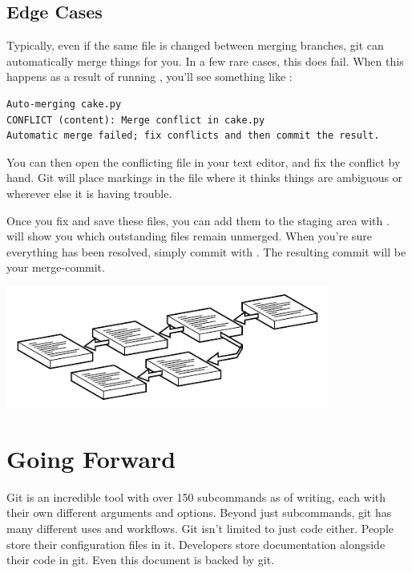 \documentclass[11pt,letterpaper,twoside]{report}
\begin{document}
\section{Edge Cases}

Typically, even if the same file is changed between merging branches, git can
automatically merge things for you. In a few rare cases, this does fail. When
this happens as a result of running , you'll see something
like \cite{git-magic}:

\begin{lstlisting}[numbers=none]
Auto-merging cake.py
CONFLICT (content): Merge conflict in cake.py
Automatic merge failed; fix conflicts and then commit the result.
\end{lstlisting}

You can then open the conflicting file in your text editor, and fix the conflict
by hand. Git will place markings in the file where it thinks things are
ambiguous or wherever else it is having trouble.

Once you fix and save these files, you can add them to the staging area with
.  will show you which outstanding files remain
unmerged. When you're sure everything has been resolved, simply commit with
. The resulting commit will be your merge-commit.

\vspace{\fill}
\begin{center}
\includegraphics[height=4cm]{resources/branching_abstract.pdf}
\end{center}
\vspace*{\fill}


\chapter{Going Forward}

Git is an incredible tool with over 150 subcommands as of writing, each with
their own different arguments and options. Beyond just subcommands, git has many
different uses and workflows. Git isn't limited to just code either. People
store their configuration files in it. Developers store documentation alongside
their code in git. Even this document is backed by git.
\end{document}
